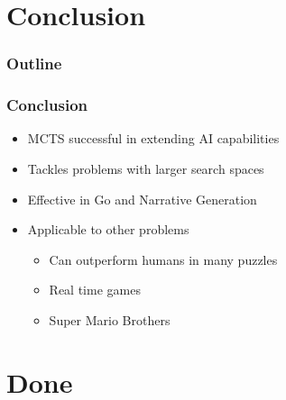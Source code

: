 \documentclass{beamer}
\begin{document}
\section{Conclusion}

\begin{frame}
\frametitle{Outline}
\tableofcontents[currentsection]
\end{frame}

\begin{frame}
\frametitle{Conclusion}
\begin{itemize}
	\item MCTS successful in extending AI capabilities
	\item Tackles problems with larger search spaces
	\item Effective in Go and Narrative Generation
	\item Applicable to other problems
	\begin{itemize}
		\item Can outperform humans in many puzzles
		\item Real time games
		\item Super Mario Brothers
	\end{itemize}
\end{itemize}
\end{frame}

\section{Done}
 
\end{document}
